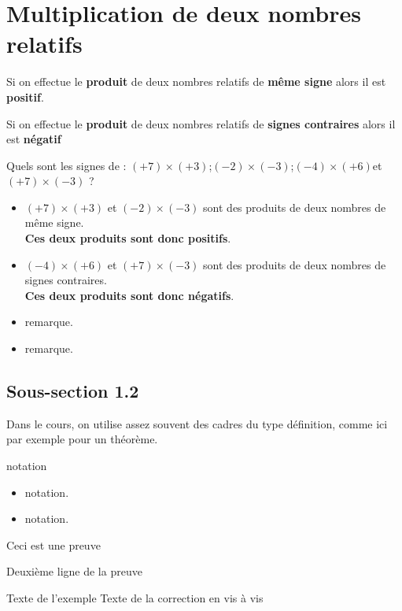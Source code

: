 \section{Multiplication de deux nombres relatifs}
\begin{propriete}[(admise)]
  Si on effectue le \textbf{produit} de deux nombres relatifs de \textbf{m\^{e}me signe} alors il est \textbf{positif}.
\end{propriete}

\begin{propriete}[(admise)]
  Si on effectue le \textbf{produit} de deux nombres relatifs de \textbf{signes contraires} alors il est \textbf{n\'egatif}
\end{propriete}

\begin{exemple*1}
  Quels sont les signes de : $(+7)\times (+3)$\hfill ;\hfill$(-2)\times(-3)$\hfill ;\hfill $(-4)\times(+6)$\hfill et \hfill $(+7)\times(-3)$ ?
  \correction
  \begin{itemize}
    \item $(+7)\times (+3)$ et $(-2)\times(-3)$ sont des produits de deux nombres de même signe.\\
    \textbf{Ces deux produits sont donc positifs}.
    \item $(-4)\times(+6)$ et $(+7)\times(-3)$ sont des produits de deux nombres de signes contraires.\\
    \textbf{Ces deux produits sont donc négatifs}.
  \end{itemize}
\end{exemple*1}

\begin{remarques}
  \begin{itemize}
    \item remarque.
    \item remarque.
  \end{itemize}
\end{remarques}

\subsection{Sous-section 1.2}
\begin{theoreme}
  Dans le cours, on utilise assez souvent des cadres du type
  définition, comme ici par exemple pour un théorème.
\end{theoreme}
\begin{notation}
  notation
\end{notation}
\begin{notations}
  \begin{itemize}
    \item notation.
    \item notation.
  \end{itemize}
\end{notations}
\begin{preuve}
  Ceci est une preuve\par Deuxième ligne de la preuve
\end{preuve}
\begin{exemple}
  Texte de l’exemple
  \correction
  Texte de la correction en vis à vis
\end{exemple}

